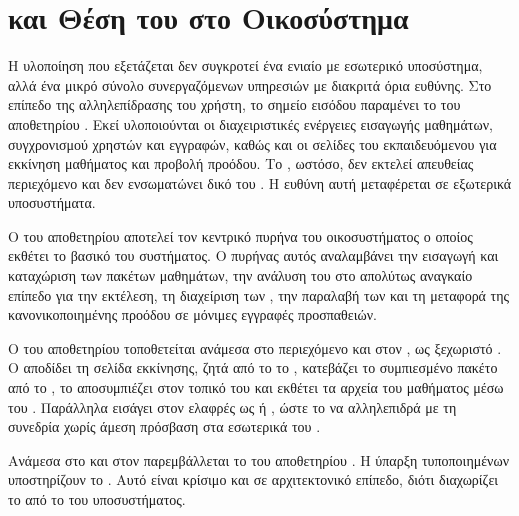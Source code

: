 \section{ και Θέση του  στο  Οικοσύστημα}
\label{sec:system_context_scorm}

Η υλοποίηση που εξετάζεται δεν συγκροτεί ένα ενιαίο  με εσωτερικό  υποσύστημα, αλλά ένα μικρό σύνολο συνεργαζόμενων υπηρεσιών με διακριτά όρια ευθύνης. Στο επίπεδο της αλληλεπίδρασης του χρήστη, το σημείο εισόδου παραμένει το  του αποθετηρίου \texttt{}. Εκεί υλοποιούνται οι διαχειριστικές ενέργειες εισαγωγής μαθημάτων, συγχρονισμού χρηστών και εγγραφών, καθώς και οι σελίδες του εκπαιδευόμενου για εκκίνηση μαθήματος και προβολή προόδου. Το , ωστόσο, δεν εκτελεί απευθείας  περιεχόμενο και δεν ενσωματώνει δικό του . Η ευθύνη αυτή μεταφέρεται σε εξωτερικά υποσυστήματα.

Ο  του αποθετηρίου \texttt{} αποτελεί τον κεντρικό  πυρήνα του οικοσυστήματος ο οποίος εκθέτει το βασικό  του συστήματος. Ο πυρήνας αυτός αναλαμβάνει την εισαγωγή και καταχώριση των πακέτων μαθημάτων, την ανάλυση του \texttt{} στο απολύτως αναγκαίο επίπεδο για την εκτέλεση, τη διαχείριση των , την παραλαβή των  και τη μεταφορά της κανονικοποιημένης προόδου σε μόνιμες εγγραφές προσπαθειών.

Ο  του αποθετηρίου \texttt{} τοποθετείται ανάμεσα στο περιεχόμενο και στον , ως ξεχωριστό . Ο  αποδίδει τη σελίδα εκκίνησης, ζητά από το  το , κατεβάζει το συμπιεσμένο πακέτο από το , το αποσυμπιέζει στον τοπικό του  και εκθέτει τα αρχεία του μαθήματος μέσω του  \texttt{}. Παράλληλα εισάγει στον  ελαφρές  ως \texttt{} ή \texttt{}, ώστε το  να αλληλεπιδρά με τη συνεδρία χωρίς άμεση πρόσβαση στα εσωτερικά  του .

Ανάμεσα στο  και στον  παρεμβάλλεται το  του αποθετηρίου \texttt{}. Η ύπαρξη τυποποιημένων \texttt{} υποστηρίζουν το . Αυτό είναι κρίσιμο και σε αρχιτεκτονικό επίπεδο, διότι διαχωρίζει το  από το  του  υποσυστήματος.

